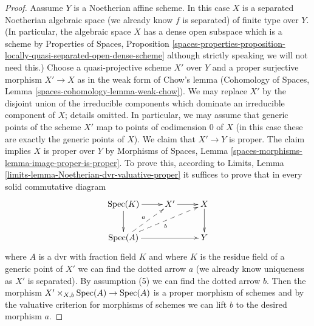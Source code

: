 \begin{proof}
\medskip\noindent
Aassume $Y$ is a Noetherian affine scheme. In this case $X$ is a
separated Noetherian algebraic space (we already know $f$ is separated)
of finite type over $Y$. (In particular, the algebraic space $X$
has a dense open subspace which is a scheme by Properties of Spaces, Proposition
\ref{spaces-properties-proposition-locally-quasi-separated-open-dense-scheme}
although strictly speaking we will not need this.)
Choose a quasi-projective scheme $X'$ over $Y$ and a proper surjective
morphism $X' \to X$ as in the weak form of Chow's lemma
(Cohomology of Spaces, Lemma \ref{spaces-cohomology-lemma-weak-chow}).
We may replace $X'$ by the disjoint union of the irreducible components
which dominate an irreducible component of $X$; details omitted.
In particular, we may assume that generic points of the scheme $X'$ map to
points of codimension $0$ of $X$ (in this case these are exactly
the generic points of $X$). We claim that $X' \to Y$ is proper.
The claim implies $X$ is proper over $Y$ by
Morphisms of Spaces, Lemma \ref{spaces-morphisms-lemma-image-proper-is-proper}.
To prove this, according to
Limits, Lemma \ref{limits-lemma-Noetherian-dvr-valuative-proper}
it suffices to prove that in every solid commutative diagram
$$
\xymatrix{
\Spec(K) \ar[r] \ar[d] & X' \ar[r] & X \ar[d] \\
\Spec(A) \ar[rr] \ar@{-->}[ru]^a \ar@{-->}[rru]_b & & Y
}
$$
where $A$ is a dvr with fraction field $K$ and where $K$ is the residue
field of a generic point of $X'$ we can find the
dotted arrow $a$ (we already know uniqueness as $X'$ is separated).
By assumption (5) we can find the dotted arrow $b$.
Then the morphism $X' \times_{X, b} \mathop{\mathrm{Spec}}(A) \to \mathop{\mathrm{Spec}}(A)$
is a proper morphism of schemes and by the valuative criterion
for morphisms of schemes we can lift $b$ to the desired morphism $a$.
\end{proof}

